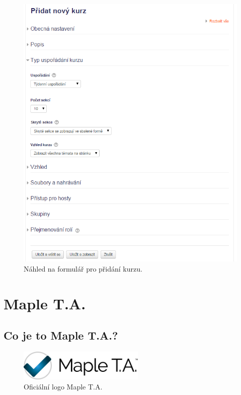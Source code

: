 \documentclass[
print,
  11pt,
  table,   
  nolof,    
  nolot,
  oneside,
  final
]{fithesis3}
\begin{document}
		\begin{figure}
		  \begin{center}
		    \includegraphics[width=120mm]{images/kurzy-pridani-detail.png}
		   \end{center}
		  \caption{Náhled na formulář pro přidání kurzu.}
		  \label{fig:moodlekurzypridanidetail}
		\end{figure}

\chapter{Maple T.A.}
	\section{Co je to Maple T.A.?}
		\begin{figure}
		  \begin{center}
		    \includegraphics[width=60mm]{images/MapleTA_logo.jpg}
		   \end{center}
		  \caption{Oficiální logo Maple T.A.  \cite{maple-logo}}
		  \label{fig:maplelogo}
		\end{figure}
\end{document}

